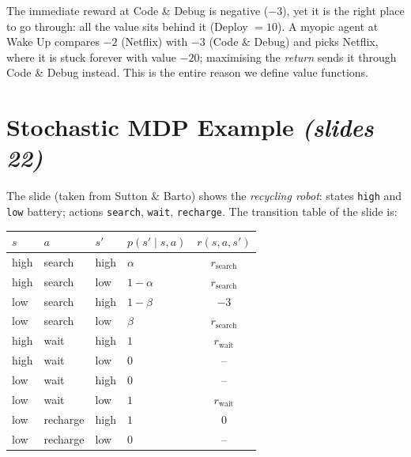 \documentclass[11pt,a4paper]{article}
\newcommand{\slr}[1]{\texorpdfstring{\emph{(slides #1)}}{(slides #1)}}
\theoremstyle{plain}
\theoremstyle{definition}
\theoremstyle{remark}
\begin{document}
\begin{intuition}
The immediate reward at Code \& Debug is negative ($-3$), yet it is the right place to go through: all the value sits behind it (Deploy $=10$). A myopic agent at Wake Up compares $-2$ (Netflix) with $-3$ (Code \& Debug) and picks Netflix, where it is stuck forever with value $-20$; maximising the \emph{return} sends it through Code \& Debug instead. This is the entire reason we define value functions.
\end{intuition}

\section{Stochastic MDP Example \slr{22}}
The slide (taken from Sutton \& Barto) shows the \emph{recycling robot}: states \texttt{high} and \texttt{low} battery; actions \texttt{search}, \texttt{wait}, \texttt{recharge}. The transition table of the slide is:
\begin{center}
\renewcommand{\arraystretch}{1.15}
\begin{tabular}{llllc}
\toprule
$s$ & $a$ & $s'$ & $p(s'\mid s,a)$ & $r(s,a,s')$\\
\midrule
high & search   & high & $\alpha$   & $r_{\text{search}}$\\
high & search   & low  & $1-\alpha$ & $r_{\text{search}}$\\
low  & search   & high & $1-\beta$  & $-3$\\
low  & search   & low  & $\beta$    & $r_{\text{search}}$\\
high & wait     & high & $1$        & $r_{\text{wait}}$\\
high & wait     & low  & $0$        & --\\
low  & wait     & high & $0$        & --\\
low  & wait     & low  & $1$        & $r_{\text{wait}}$\\
low  & recharge & high & $1$        & $0$\\
low  & recharge & low  & $0$        & --\\
\bottomrule
\end{tabular}
\end{center}
\end{document}
